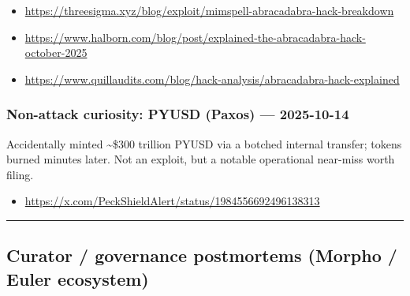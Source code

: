 \begin{itemize}
\tightlist
\item
  \url{https://threesigma.xyz/blog/exploit/mimspell-abracadabra-hack-breakdown}
\item
  \url{https://www.halborn.com/blog/post/explained-the-abracadabra-hack-october-2025}
\item
  \url{https://www.quillaudits.com/blog/hack-analysis/abracadabra-hack-explained}
\end{itemize}

\subsubsection{Non-attack curiosity: PYUSD (Paxos) --- 2025-10-14}\label{non-attack-curiosity-pyusd-paxos-2025-10-14}

Accidentally minted \textasciitilde\$300 trillion PYUSD via a botched internal transfer; tokens burned minutes later. Not an exploit, but a notable operational near-miss worth filing.

\begin{itemize}
\tightlist
\item
  \url{https://x.com/PeckShieldAlert/status/1984556692496138313}
\end{itemize}

\begin{center}\rule{0.5\linewidth}{0.5pt}\end{center}

\subsection{Curator / governance postmortems (Morpho / Euler ecosystem)}\label{curator-governance-postmortems-morpho-euler-ecosystem}

